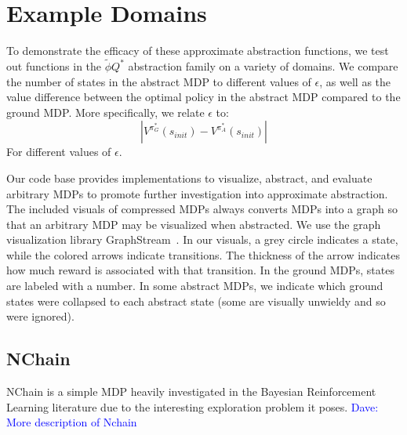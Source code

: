 \documentclass{article}
\newcommand{\ep}{\widetilde \phi}
\newcommand\dnote[1]{\textcolor{blue}{Dave: #1}}
\begin{document}



\section{Example Domains}

To demonstrate the efficacy of these approximate abstraction functions, we test out functions in the $\ep{Q^*}$ abstraction family on a variety of domains. We compare the number of states in the abstract MDP to different values of $\epsilon$, as well as the value difference between the optimal policy in the abstract MDP compared to the ground MDP. More specifically, we relate $\epsilon$ to:
\begin{equation}
|V^{\pi_G^*}(s_{init}) - V^{\pi_A^*}(s_{init})|
\end{equation}
For different values of $\epsilon$.

Our code base provides implementations to visualize, abstract, and evaluate arbitrary MDPs to promote further investigation into approximate abstraction. The included visuals of compressed MDPs always converts MDPs into a graph so that an arbitrary MDP may be visualized when abstracted. We use the graph visualization library GraphStream~\cite{graphstream}. In our visuals, a grey circle indicates a state, while the colored arrows indicate transitions. The thickness of the arrow indicates how much reward is associated with that transition. In the ground MDPs, states are labeled with a number. In some abstract MDPs, we indicate which ground states were collapsed to each abstract state (some are visually unwieldy and so were ignored).


\subsection{NChain}

NChain is a simple MDP heavily investigated in the Bayesian Reinforcement Learning literature due to the interesting exploration problem it poses. \dnote{More description of Nchain}
\end{document}
